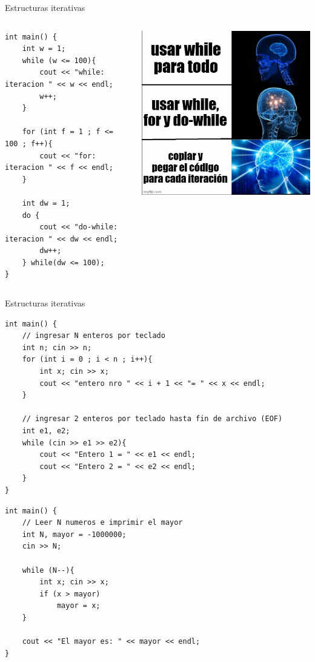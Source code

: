 \documentclass[12pt]{beamer}
\begin{document}
\begin{frame}[fragile]{Estructuras iterativas}
    \begin{columns}
        \begin{lstlisting}[basicstyle=\tiny]
int main() {
    int w = 1;
    while (w <= 100){
        cout << "while: iteracion " << w << endl; 
        w++;
    }

    for (int f = 1 ; f <= 100 ; f++){
        cout << "for: iteracion " << f << endl;
    } 

    int dw = 1;
    do {
        cout << "do-while: iteracion " << dw << endl;
        dw++;
    } while(dw <= 100);
}
\end{lstlisting}
        \includegraphics[width=\textwidth]{iterativas_meme.jpg}
    \end{columns}
\end{frame}

\begin{frame}[fragile]{Estructuras iterativas}
\begin{lstlisting}[basicstyle=\tiny]
int main() {
    // ingresar N enteros por teclado
    int n; cin >> n;
    for (int i = 0 ; i < n ; i++){
        int x; cin >> x;
        cout << "entero nro " << i + 1 << "= " << x << endl;
    }

    // ingresar 2 enteros por teclado hasta fin de archivo (EOF)
    int e1, e2;
    while (cin >> e1 >> e2){
        cout << "Entero 1 = " << e1 << endl;
        cout << "Entero 2 = " << e2 << endl;   
    }
}
\end{lstlisting}
\begin{lstlisting}[basicstyle=\tiny]
int main() {
    // Leer N numeros e imprimir el mayor
    int N, mayor = -1000000;
    cin >> N;
    
    while (N--){
        int x; cin >> x;
        if (x > mayor)
            mayor = x;
    }
    
    cout << "El mayor es: " << mayor << endl;
}
\end{lstlisting}
\end{frame}
\end{document}
